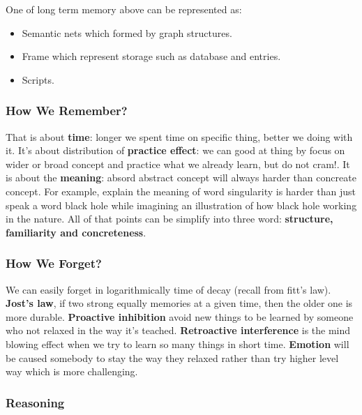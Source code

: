 \documentclass[11pt]{article}
\providecommand{\tightlist}{%
      \setlength{\itemsep}{0pt}\setlength{\parskip}{0pt}}
\begin{document}
One of long term memory above can be represented as:

\begin{itemize}
\tightlist
\item
  Semantic nets which formed by graph structures.
\item
  Frame which represent storage such as database and entries.
\item
  Scripts.
\end{itemize}

    \subsubsection{How We Remember?}\label{how-we-remember}

That is about \textbf{time}: longer we spent time on specific thing,
better we doing with it. It's about distribution of \textbf{practice
effect}: we can good at thing by focus on wider or broad concept and
practice what we already learn, but do not cram!. It is about the
\textbf{meaning}: absord abstract concept will always harder than
concreate concept. For example, explain the meaning of word singularity
is harder than just speak a word black hole while imagining an
illustration of how black hole working in the nature. All of that points
can be simplify into three word: \textbf{structure, familiarity and
concreteness}.

    \subsubsection{How We Forget?}\label{how-we-forget}

We can easily forget in logarithmically time of decay (recall from
fitt's law). \textbf{Jost's law}, if two strong equally memories at a
given time, then the older one is more durable. \textbf{Proactive
inhibition} avoid new things to be learned by someone who not relaxed in
the way it's teached. \textbf{Retroactive interference} is the mind
blowing effect when we try to learn so many things in short time.
\textbf{Emotion} will be caused somebody to stay the way they relaxed
rather than try higher level way which is more challenging.

    \subsubsection{Reasoning}\label{reasoning}
\end{document}
